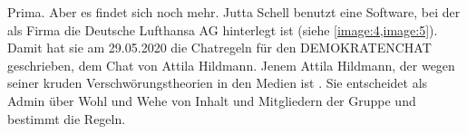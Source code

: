 Prima. Aber es findet sich noch mehr. Jutta Schell benutzt eine Software, bei der als Firma die Deutsche Lufthansa AG hinterlegt ist (siehe \cref{image:4,image:5}). Damit hat sie am 29.05.2020 die Chatregeln für den DEMOKRATENCHAT geschrieben, dem Chat von Attila Hildmann. Jenem Attila Hildmann, der wegen seiner kruden Verschwörungstheorien in den Medien ist \autocite{3}\autocite{4}\autocite{5}\autocite{6}\autocite{7}.
Sie entscheidet als Admin über Wohl und Wehe von Inhalt und Mitgliedern der Gruppe und bestimmt die Regeln.
\begin{figure}[hbt]\centering
  \caption{}
\end{figure}

\newpage
